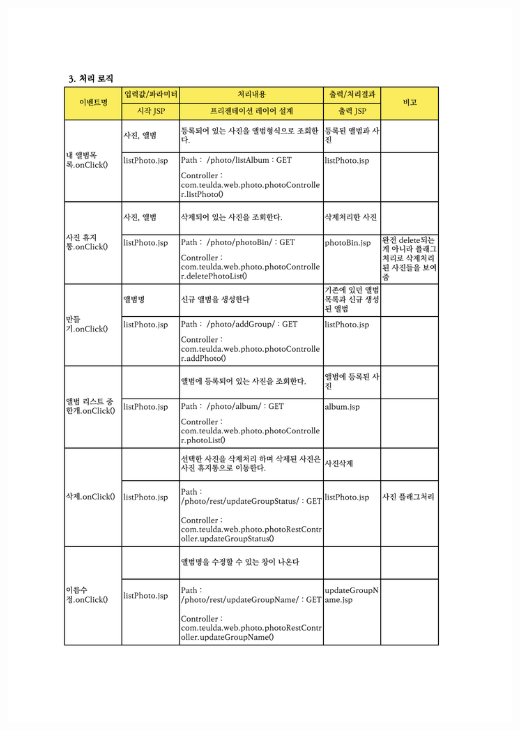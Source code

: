 {{{{{{{{{{{{{{{{{{{{{{{{{{{{{{{{{{{{{{{{{{{{{{\includegraphics[width=20cm]{./Figure/Design/Display/photo/photo_02.pdf} \\
}}}}}}}}}}}}}}}}}}}}}}}}}}}}}}}}}}}}}}}}}}}}}}
